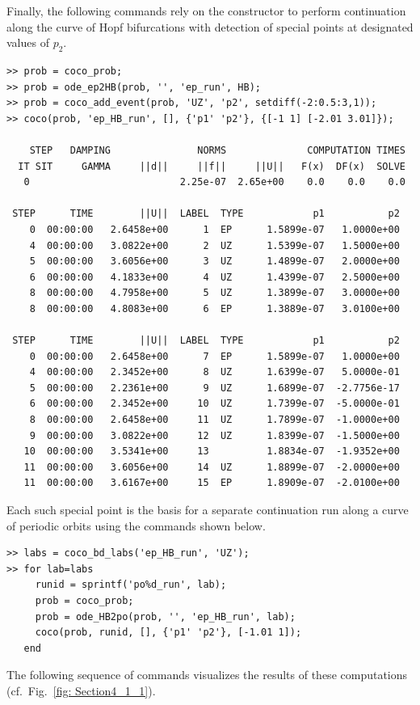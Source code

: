 Finally, the following commands rely on the  constructor to perform continuation along the curve of Hopf bifurcations with detection of special points at designated values of $p_2$.
\begin{lstlisting}[language=coco-highlight,frame=lines]
>> prob = coco_prob;
>> prob = ode_ep2HB(prob, '', 'ep_run', HB);
>> prob = coco_add_event(prob, 'UZ', 'p2', setdiff(-2:0.5:3,1));
>> coco(prob, 'ep_HB_run', [], {'p1' 'p2'}, {[-1 1] [-2.01 3.01]});

    STEP   DAMPING               NORMS              COMPUTATION TIMES
  IT SIT     GAMMA     ||d||     ||f||     ||U||   F(x)  DF(x)  SOLVE
   0                          2.25e-07  2.65e+00    0.0    0.0    0.0

 STEP      TIME        ||U||  LABEL  TYPE            p1           p2
    0  00:00:00   2.6458e+00      1  EP      1.5899e-07   1.0000e+00
    4  00:00:00   3.0822e+00      2  UZ      1.5399e-07   1.5000e+00
    5  00:00:00   3.6056e+00      3  UZ      1.4899e-07   2.0000e+00
    6  00:00:00   4.1833e+00      4  UZ      1.4399e-07   2.5000e+00
    8  00:00:00   4.7958e+00      5  UZ      1.3899e-07   3.0000e+00
    8  00:00:00   4.8083e+00      6  EP      1.3889e-07   3.0100e+00

 STEP      TIME        ||U||  LABEL  TYPE            p1           p2
    0  00:00:00   2.6458e+00      7  EP      1.5899e-07   1.0000e+00
    4  00:00:00   2.3452e+00      8  UZ      1.6399e-07   5.0000e-01
    5  00:00:00   2.2361e+00      9  UZ      1.6899e-07  -2.7756e-17
    6  00:00:00   2.3452e+00     10  UZ      1.7399e-07  -5.0000e-01
    8  00:00:00   2.6458e+00     11  UZ      1.7899e-07  -1.0000e+00
    9  00:00:00   3.0822e+00     12  UZ      1.8399e-07  -1.5000e+00
   10  00:00:00   3.5341e+00     13          1.8834e-07  -1.9352e+00
   11  00:00:00   3.6056e+00     14  UZ      1.8899e-07  -2.0000e+00
   11  00:00:00   3.6167e+00     15  EP      1.8909e-07  -2.0100e+00
\end{lstlisting}
Each such special point is the basis for a separate continuation run along a curve of periodic orbits using the commands shown below.
\begin{lstlisting}[language=coco-highlight,frame=lines]
>> labs = coco_bd_labs('ep_HB_run', 'UZ');
>> for lab=labs
     runid = sprintf('po%d_run', lab);
     prob = coco_prob;
     prob = ode_HB2po(prob, '', 'ep_HB_run', lab);
     coco(prob, runid, [], {'p1' 'p2'}, [-1.01 1]);
   end
\end{lstlisting}
The following sequence of commands visualizes the results of these computations (cf.\ Fig.~\ref{fig: Section4_1_1}).
